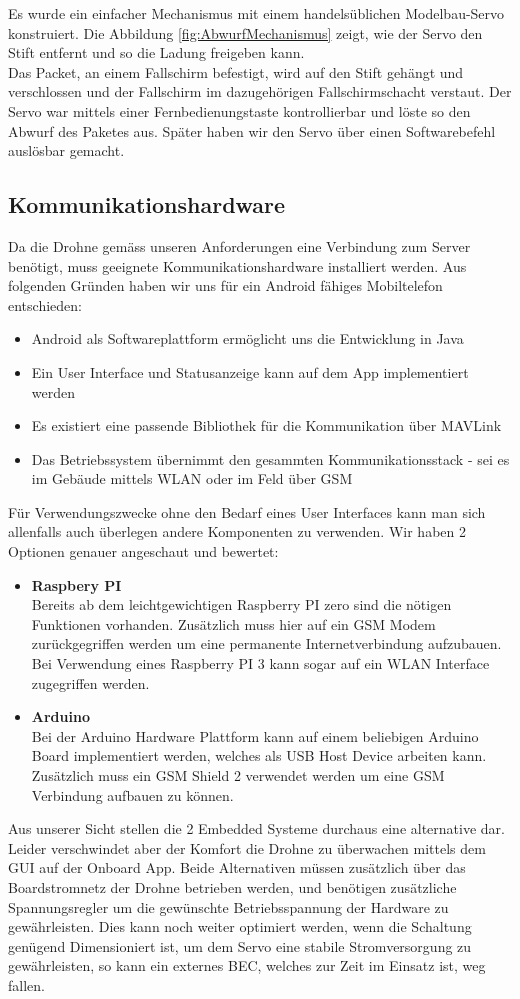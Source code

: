 Es wurde ein einfacher Mechanismus mit einem handelsüblichen Modelbau-Servo konstruiert. Die Abbildung \ref{fig:AbwurfMechanismus} zeigt, wie der Servo den Stift entfernt und so die Ladung freigeben kann. \\
Das Packet, an einem Fallschirm befestigt, wird auf den Stift gehängt und verschlossen und der Fallschirm im dazugehörigen Fallschirmschacht verstaut. Der Servo war mittels einer Fernbedienungstaste kontrollierbar und löste so den Abwurf des Paketes aus. Später haben wir den Servo über einen Softwarebefehl auslösbar gemacht. 

\subsection{Kommunikationshardware}
Da die Drohne gemäss unseren Anforderungen eine Verbindung zum Server benötigt, muss geeignete Kommunikationshardware installiert werden. Aus folgenden Gründen haben wir uns für ein Android fähiges Mobiltelefon entschieden:
\begin{itemize}
	\item{Android als Softwareplattform ermöglicht uns die Entwicklung in Java}
	\item{Ein User Interface und Statusanzeige kann auf dem App implementiert werden}
	\item{Es existiert eine passende Bibliothek für die Kommunikation über MAVLink}
	\item{Das Betriebssystem übernimmt den gesammten Kommunikationsstack - sei es im Gebäude mittels WLAN oder im Feld über GSM}
\end{itemize}
Für Verwendungszwecke ohne den Bedarf eines User Interfaces kann man sich allenfalls auch überlegen andere Komponenten zu verwenden. Wir haben 2 Optionen genauer angeschaut und bewertet:
\begin{itemize}
	\item{\textbf{Raspbery PI} \\
	Bereits ab dem leichtgewichtigen Raspberry PI zero sind die nötigen Funktionen vorhanden. Zusätzlich muss hier auf ein GSM Modem zurückgegriffen werden um eine permanente Internetverbindung aufzubauen. Bei Verwendung eines Raspberry PI 3 kann sogar auf ein WLAN Interface zugegriffen werden.
	}
	\item{\textbf{Arduino} \\
	Bei der Arduino Hardware Plattform kann auf einem beliebigen Arduino Board implementiert werden, welches als USB Host Device arbeiten kann. Zusätzlich muss ein GSM Shield 2 verwendet werden um eine GSM Verbindung aufbauen zu können.}
\end{itemize}
Aus unserer Sicht stellen die 2 Embedded Systeme durchaus eine alternative dar. Leider verschwindet aber der Komfort die Drohne zu überwachen mittels dem GUI auf der Onboard App. Beide Alternativen müssen zusätzlich über das Boardstromnetz der Drohne betrieben werden, und benötigen zusätzliche Spannungsregler um die gewünschte Betriebsspannung der Hardware zu gewährleisten. Dies kann noch weiter optimiert werden, wenn die Schaltung genügend Dimensioniert ist, um dem Servo eine stabile Stromversorgung zu gewährleisten, so kann ein externes BEC, welches zur Zeit im Einsatz ist, weg fallen.\\

